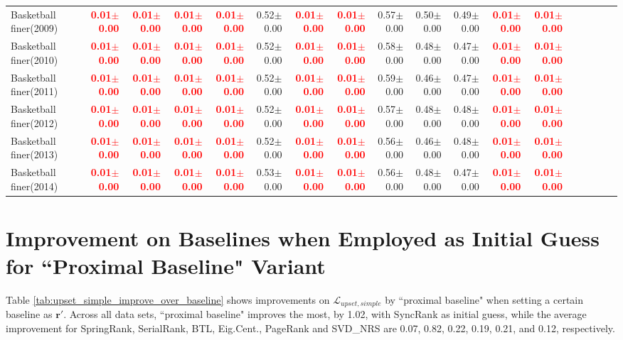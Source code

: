 \documentclass[nohyperref]{article}
\theoremstyle{plain}
\theoremstyle{definition}
\theoremstyle{remark}
\newcommand{\red}[1]{\textcolor{red}{\textbf{#1}}}
\begin{document}
\begin{table*}[!ht]
{\begin{tabular}{lrrrrrrrrrrrrrrrrr}
			Basketball finer(2009) & \red{0.01$\pm$0.00} & \red{0.01$\pm$0.00} & \red{0.01$\pm$0.00} & \red{0.01$\pm$0.00} & 0.52$\pm$0.00 & \red{0.01$\pm$0.00} & \red{0.01$\pm$0.00} & 0.57$\pm$0.00 & 0.50$\pm$0.00 & 0.49$\pm$0.00 & \red{0.01$\pm$0.00} & \red{0.01$\pm$0.00} \\
			Basketball finer(2010) & \red{0.01$\pm$0.00} & \red{0.01$\pm$0.00} & \red{0.01$\pm$0.00} & \red{0.01$\pm$0.00} & 0.52$\pm$0.00 & \red{0.01$\pm$0.00} & \red{0.01$\pm$0.00} & 0.58$\pm$0.00 & 0.48$\pm$0.00 & 0.47$\pm$0.00 & \red{0.01$\pm$0.00} & \red{0.01$\pm$0.00} \\
			Basketball finer(2011) & \red{0.01$\pm$0.00} & \red{0.01$\pm$0.00} & \red{0.01$\pm$0.00} & \red{0.01$\pm$0.00} & 0.52$\pm$0.00 & \red{0.01$\pm$0.00} & \red{0.01$\pm$0.00} & 0.59$\pm$0.00 & 0.46$\pm$0.00 & 0.47$\pm$0.00 & \red{0.01$\pm$0.00} & \red{0.01$\pm$0.00} \\
			Basketball finer(2012) & \red{0.01$\pm$0.00} & \red{0.01$\pm$0.00} & \red{0.01$\pm$0.00} & \red{0.01$\pm$0.00} & 0.52$\pm$0.00 & \red{0.01$\pm$0.00} & \red{0.01$\pm$0.00} & 0.57$\pm$0.00 & 0.48$\pm$0.00 & 0.48$\pm$0.00 & \red{0.01$\pm$0.00} & \red{0.01$\pm$0.00} \\
			Basketball finer(2013) & \red{0.01$\pm$0.00} & \red{0.01$\pm$0.00} & \red{0.01$\pm$0.00} & \red{0.01$\pm$0.00} & 0.52$\pm$0.00 & \red{0.01$\pm$0.00} & \red{0.01$\pm$0.00} & 0.56$\pm$0.00 & 0.46$\pm$0.00 & 0.48$\pm$0.00 & \red{0.01$\pm$0.00} & \red{0.01$\pm$0.00} \\
			Basketball finer(2014) & \red{0.01$\pm$0.00} & \red{0.01$\pm$0.00} & \red{0.01$\pm$0.00} & \red{0.01$\pm$0.00} & 0.53$\pm$0.00 & \red{0.01$\pm$0.00} & \red{0.01$\pm$0.00} & 0.56$\pm$0.00 & 0.48$\pm$0.00 & 0.47$\pm$0.00 & \red{0.01$\pm$0.00} & \red{0.01$\pm$0.00} \\
\bottomrule
\end{tabular}}
\end{table*}

\section{Improvement on Baselines when Employed as Initial Guess for ``Proximal Baseline" Variant}
\label{appendix_sec:improvement_over_baselines}
Table \ref{tab:upset_simple_improve_over_baseline} shows improvements on $\mathcal{L}_{upset, simple}$ by ``proximal baseline" when setting a certain baseline as $\mathbf{r}'$. Across all data sets, ``proximal baseline" improves the most, by 1.02, with SyncRank as initial guess,
while the average improvement for SpringRank, SerialRank, BTL, Eig.Cent., PageRank and SVD\_NRS are 0.07, 0.82, 0.22, 0.19, 0.21, and 0.12, respectively.
\end{document}
